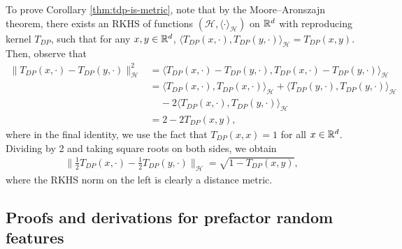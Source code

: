 To prove Corollary \ref{thm:tdp-is-metric}, note that by the Moore--Aronszajn theorem, there exists an RKHS of functions $(\mathcal H, \langle\cdot\rangle_\mathcal{H})$ on $\mathbb{R}^d$ with reproducing kernel $T_{DP}$, such that for any $x,y\in\mathbb{R}^d$, $\langle T_{DP}(x,\cdot), T_{DP}(y,\cdot) \rangle_\mathcal{H} = T_{DP}(x,y)$. Then, observe that 
\begin{align*}
\|T_{DP}(x,\cdot)-T_{DP}(y,\cdot)\|_\mathcal{H}^2
&= \langle T_{DP}(x,\cdot)- T_{DP}(y,\cdot),T_{DP}(x,\cdot)- T_{DP}(y,\cdot) \rangle_\mathcal{H} \\
&= \langle T_{DP}(x,\cdot),T_{DP}(x,\cdot) \rangle_\mathcal{H} 
+ \langle T_{DP}(y,\cdot), T_{DP}(y,\cdot) \rangle_\mathcal{H} \\
& ~~~~~- 2 \langle T_{DP}(x,\cdot), T_{DP}(y,\cdot) \rangle_\mathcal{H} \\
& = 2 - 2T_{DP}(x,y),
\end{align*}
where in the final identity, we use the fact that $T_{DP}(x,x)=1$ for all $x\in\mathbb{R}^d$. Dividing by 2 and taking square roots on both sides, we obtain
\begin{align*}
\Big\|\frac{1}{2}T_{DP}(x,\cdot)-\frac{1}{2}T_{DP}(y,\cdot)\Big\|_\mathcal{H} = \sqrt{1-T_{DP}(x,y)},
\end{align*}
where the RKHS norm on the left is clearly a distance metric. 

\subsection{Proofs and derivations for prefactor random features}
\label{apdx:prefactor-sketch}

